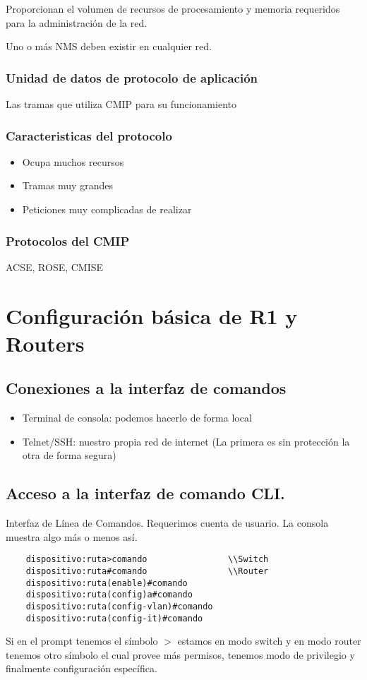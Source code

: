 Proporcionan el volumen de recursos de procesamiento y memoria requeridos para la administración de la red.

Uno o más NMS deben existir en cualquier red.

\subsection{Unidad de datos de protocolo de aplicación}
Las tramas que utiliza CMIP para su funcionamiento

\subsection{Caracteristicas del protocolo}
\begin{itemize}
    \item Ocupa muchos recursos
    \item Tramas muy grandes
    \item Peticiones muy complicadas de realizar
\end{itemize}

\subsection{Protocolos del CMIP}
ACSE, ROSE, CMISE

\chapter{Configuración básica de R1 y Routers}
\section{Conexiones a la interfaz de comandos}
\begin{itemize}
    \item {Terminal de consola: podemos hacerlo de forma local}
    \item {Telnet/SSH: nuestro propia red de internet (La primera es sin protección la otra de forma segura)}
\end{itemize}
\section{Acceso a la interfaz de comando CLI.}
Interfaz de Línea de Comandos. Requerimos cuenta de usuario. La consola muestra algo más o menos así.

\begin{lstlisting}
    dispositivo:ruta>comando                \\Switch
    dispositivo:ruta#comando                \\Router
    dispositivo:ruta(enable)#comando      
    dispositivo:ruta(config)a#comando
    dispositivo:ruta(config-vlan)#comando
    dispositivo:ruta(config-it)#comando
\end{lstlisting}
Si en el prompt tenemos el símbolo $>$ estamos en modo switch y en modo router tenemos otro símbolo el cual provee más permisos, tenemos modo de privilegio y finalmente configuración específica.\\\\

